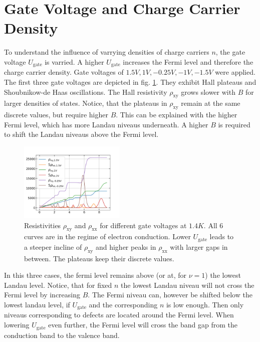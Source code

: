 \section{Gate Voltage and Charge Carrier Density}
To understand the influence of varrying densities of charge carriers $n$, 
the gate voltage $U_\text{gate}$ is varried.
A higher $U_\text{gate}$ increases the Fermi level and therefore the charge carrier density.
Gate voltages of  $1.5V, 1V, -0.25V, -1V, -1.5V$ were applied.
The first three gate voltages are depicted in fig. \ref{fig:differentGateVoltagesQHE}.
They exhibit Hall plateaus and Shoubnikow-de Haas oscillations.
The Hall resistivity $\rho_\text{xy}$ grows slower with $B$ for larger densities of states.
Notice, that the plateaus in $\rho_\text{xy}$ remain at the same discrete values, but require higher $B$.
This can be explained with the higher Fermi level, which has more Landau niveaus underneath.
A higher $B$ is required to shift the Landau niveaus above the Fermi level.
\begin{figure}[h]
    \centering
    \includegraphics[width=0.45\textwidth]{../Images/differentGateVoltagesQHE.png}
    \caption{Resistivities $\rho_\text{xy}$ and $\rho_\text{xx}$ for different gate voltages at $1.4K$. 
    All 6 curves are in the regime of electron conduction.
    Lower $U_\text{gate}$
     leads to a steeper incline of $\rho_\text{xy}$ and higher peaks in $\rho_\text{xx}$ with larger gaps in between.
    The plateaus keep their discrete values.
}
    \label{fig:differentGateVoltagesQHE}
\end{figure}
In this three cases, the fermi level remains above (or at, for $\nu=1$) the lowest Landau level.
Notice, that for fixed $n$ the lowest Landau niveau will not cross the Fermi level by increasing $B$.
The Fermi niveau can, however be shifted below the lowest landau level, if $U_\text{gate}$ and the corresponding $n$ is low enough.
Then only niveaus corresponding to defects are located around the Fermi level.
When lowering $U_\text{gate}$ even further, the Fermi level will cross the band gap from the conduction band to the valence band.
